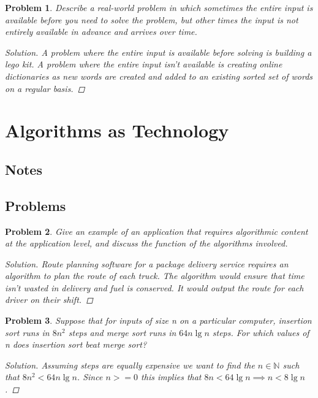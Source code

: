\documentclass[oneside]{book}
\newtheorem{problem}{Problem}[section]
\begin{document}
\begin{spacing}{1.618}
\begin{problem}
	Describe a real-world problem in which sometimes the entire input is available before you need to solve the problem, but other times the input is not entirely available in advance and arrives over time.
	\begin{proof}[Solution]
		A problem where the entire input is available before solving is building a lego kit. A problem where the entire input isn't available is creating online dictionaries as new words are created and added to an existing sorted set of words on a regular basis. 
	\end{proof}
\end{problem}

\section{Algorithms as Technology}

\subsection{Notes}

\subsection{Problems}

\begin{problem}
	Give an example of an application that requires algorithmic content at the application level, and discuss the function of the algorithms involved.
	\begin{proof}[Solution]
		Route planning software for a package delivery service requires an algorithm to plan the route of each truck. The algorithm would ensure that time isn't wasted in delivery and fuel is conserved. It would output the route for each driver on their shift. 
	\end{proof}
\end{problem}

\begin{problem}
	Suppose that for inputs of size n on a particular computer, insertion sort runs in $8n^2$ steps and merge sort runs in $64n\lg{n}$ steps. For which values of n does insertion sort beat merge sort?
	\begin{proof}[Solution]
		Assuming steps are equally expensive we want to find the $n\in\mathbb{N}$ such that $8n^2 < 64n\lg{n}$. Since $n>=0$ this implies that $8n < 64\lg{n}\implies n < 8\lg{n}$. 
		

\end{proof}
\end{problem}
\end{spacing}
\end{document}
